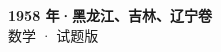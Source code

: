 \documentclass[zihao=-4, a4paper]{ctexart}
\begin{document}
\begin{center}
  {\Large\bfseries 1958 年·黑龙江、吉林、辽宁卷}\\[4pt]
  {\large 数学 · 试题版}
\end{center}
\medskip
{}

\end{document}
